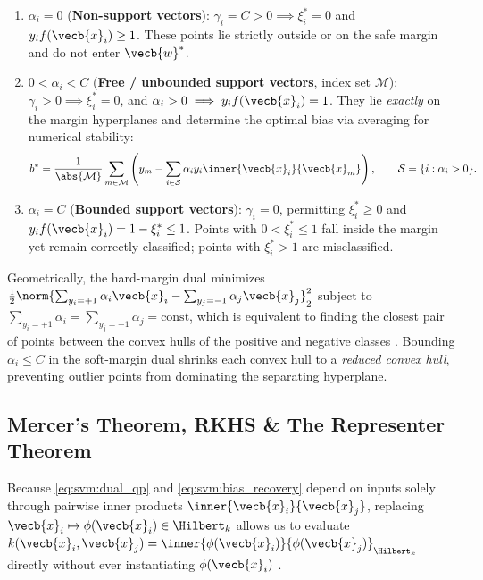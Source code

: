 \documentclass[../../../../master.tex]{subfiles}
\begin{document}
\begin{coremath}
\begin{enumerate}
  \item $\alpha_i = 0$ (\textbf{Non-support vectors}): $\gamma_i = C > 0 \implies \xi_i^* = 0$ and $y_i f(\vecb{x}_i) \ge 1$. These points lie strictly outside or on the safe margin and do not enter $\vecb{w}^*$.
  \item $0 < \alpha_i < C$ (\textbf{Free / unbounded support vectors}, index set $\mathcal{M}$): $\gamma_i > 0 \implies \xi_i^* = 0$, and $\alpha_i > 0 \implies y_i f(\vecb{x}_i) = 1$. They lie \emph{exactly} on the margin hyperplanes and determine the optimal bias via averaging for numerical stability:
  \begin{equation}
    b^* = \frac{1}{\abs{\mathcal{M}}} \sum_{m \in \mathcal{M}} \left( y_m - \sum_{i \in \mathcal{S}} \alpha_i y_i \inner{\vecb{x}_i}{\vecb{x}_m} \right), \qquad \mathcal{S} = \{i : \alpha_i > 0\}.
    \label{eq:svm:bias_recovery}
  \end{equation}
  \item $\alpha_i = C$ (\textbf{Bounded support vectors}): $\gamma_i = 0$, permitting $\xi_i^* \ge 0$ and $y_i f(\vecb{x}_i) = 1 - \xi_i^* \le 1$. Points with $0 < \xi_i^* \le 1$ fall inside the margin yet remain correctly classified; points with $\xi_i^* > 1$ are misclassified.
\end{enumerate}
\end{coremath}

\begin{intuition}
Geometrically, the hard-margin dual minimizes $\frac{1}{2}\norm{\sum_{y_i=+1}\alpha_i \vecb{x}_i - \sum_{y_j=-1}\alpha_j \vecb{x}_j}_2^2$ subject to $\sum_{y_i=+1}\alpha_i = \sum_{y_j=-1}\alpha_j = \text{const}$, which is equivalent to finding the closest pair of points between the convex hulls of the positive and negative classes . Bounding $\alpha_i \le C$ in the soft-margin dual shrinks each convex hull to a \emph{reduced convex hull}, preventing outlier points from dominating the separating hyperplane.
\end{intuition}

\subsection{Mercer's Theorem, RKHS \& The Representer Theorem}

Because \eqref{eq:svm:dual_qp} and \eqref{eq:svm:bias_recovery} depend on inputs solely through pairwise inner products $\inner{\vecb{x}_i}{\vecb{x}_j}$, replacing $\vecb{x}_i \mapsto \phi(\vecb{x}_i) \in \Hilbert_k$ allows us to evaluate $k(\vecb{x}_i, \vecb{x}_j) = \inner{\phi(\vecb{x}_i)}{\phi(\vecb{x}_j)}_{\Hilbert_k}$ directly without ever instantiating $\phi(\vecb{x}_i)$  .
\end{document}
